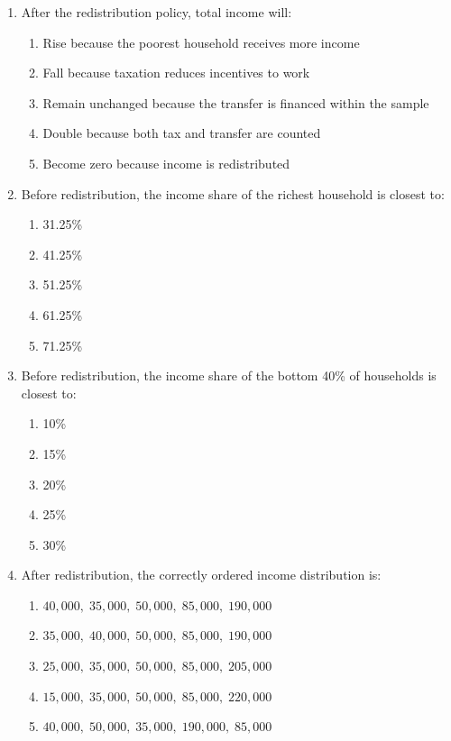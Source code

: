 \documentclass[12pt]{article}
\begin{document}
\begin{enumerate}[label=\textbf{\arabic*.}]
\item After the redistribution policy, total income will:
\begin{enumerate}[label=\Alph*.]
\item Rise because the poorest household receives more income
\item Fall because taxation reduces incentives to work
\item Remain unchanged because the transfer is financed within the sample
\item Double because both tax and transfer are counted
\item Become zero because income is redistributed
\end{enumerate}

\item Before redistribution, the income share of the richest household is closest to:
\begin{enumerate}[label=\Alph*.]
\item 31.25\%
\item 41.25\%
\item 51.25\%
\item 61.25\%
\item 71.25\%
\end{enumerate}

\item Before redistribution, the income share of the bottom 40\% of households is closest to:
\begin{enumerate}[label=\Alph*.]
\item 10\%
\item 15\%
\item 20\%
\item 25\%
\item 30\%
\end{enumerate}
\newpage
\item After redistribution, the correctly ordered income distribution is:
\begin{enumerate}[label=\Alph*.]
\item \(40{,}000,\;35{,}000,\;50{,}000,\;85{,}000,\;190{,}000\)
\item \(35{,}000,\;40{,}000,\;50{,}000,\;85{,}000,\;190{,}000\)
\item \(25{,}000,\;35{,}000,\;50{,}000,\;85{,}000,\;205{,}000\)
\item \(15{,}000,\;35{,}000,\;50{,}000,\;85{,}000,\;220{,}000\)
\item \(40{,}000,\;50{,}000,\;35{,}000,\;190{,}000,\;85{,}000\)
\end{enumerate}


\end{enumerate}
\end{document}
